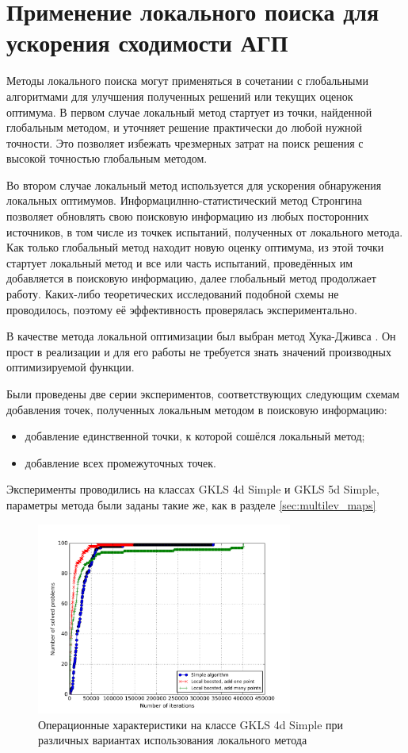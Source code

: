 \section{Применение локального поиска для ускорения сходимости АГП}
Методы локального поиска могут применяться в сочетании с глобальными алгоритмами для улучшения полученных решений или текущих оценок оптимума.
В первом случае локальный метод стартует из точки, найденной глобальным методом, и уточняет решение практически до любой нужной точности. Это
позволяет избежать чрезмерных затрат на поиск решения с высокой точностью глобальным методом.
\par
Во втором случае локальный метод используется для ускорения обнаружения локальных оптимумов.
Информацилнно-статистический метод Стронгина позволяет обновлять свою поисковую информацию из любых посторонних источников, в том числе из точкек испытаний,
полученных от локального метода.
Как только глобальный метод находит новую оценку оптимума, из этой точки стартует локальный метод и все или часть испытаний, проведённых им
добавляется в поисковую информацию, далее глобальный метод продолжает работу. Каких-либо теоретических исследований подобной схемы не проводилось, поэтому её эффективность проверялась экспериментально.
\par
В качестве метода локальной оптимизации был выбран метод Хука-Дживса \cite{himmelblau}. Он прост в реализации и для его работы не требуется знать значений
 производных оптимизируемой функции.
\par
Были проведены две серии экспериментов, соответствующих следующим схемам добавления точек, полученных локальным методом в поисковую информацию:
\begin{itemize}
    \item добавление единственной точки, к которой сошёлся локальный метод;
    \item добавление всех промежуточных точек.
\end{itemize}
\par
Эксперименты проводились на классах GKLS 4d Simple и GKLS 5d Simple, параметры метода были заданы такие же, как в разделе \ref{sec:multilev_maps}
\begin{figure}[ht]
  \center
  \includegraphics[width=0.75\textwidth]{images/local_search_op.png}
  \caption{Операционные характеристики на классе GKLS 4d Simple при различных вариантах использования локального метода}
  \label{fig:loaclsearchOP}
\end{figure}
